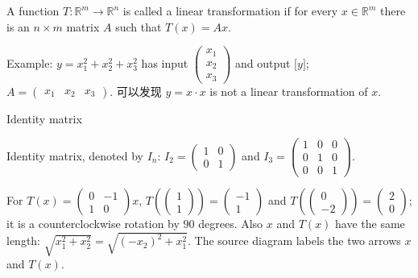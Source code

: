 \begin{definition}{}

A function \(T:\mathbb{R}^{m}\rightarrow\mathbb{R}^{n}\) is called a linear transformation if for every \(x \in \mathbb{R}^{m}\) there is an \(n \times m\) matrix \(A\) such that \(T(x) = Ax\).

Example: \(y = x_{1}^{2} + x_{2}^{2} + x_{3}^{2}\) has input \(\begin{pmatrix}
x_{1} \\
x_{2} \\
x_{3}
\end{pmatrix}\) and output \(\lbrack y\rbrack\); \(A = \begin{pmatrix}
x_{1} & x_{2} & x_{3}
\end{pmatrix}\). 可以发现 \(y = x \cdot x\) is not a linear transformation of \(x\).

\end{definition}

\begin{definition}{Identity matrix}

Identity matrix, denoted by \(I_{n}\): \(I_{2} = \begin{pmatrix}
1 & 0 \\
0 & 1
\end{pmatrix}\) and \(I_{3} = \begin{pmatrix}
1 & 0 & 0 \\
0 & 1 & 0 \\
0 & 0 & 1
\end{pmatrix}\).

For \(T(x) = \begin{pmatrix}
0 & {- 1} \\
1 & 0
\end{pmatrix}x\), \(T\left( \begin{pmatrix}
1 \\
1
\end{pmatrix} \right) = \begin{pmatrix}
{- 1} \\
1
\end{pmatrix}\) and \(T\left( \begin{pmatrix}
0 \\
{- 2}
\end{pmatrix} \right) = \begin{pmatrix}
2 \\
0
\end{pmatrix}\); it is a counterclockwise rotation by \(90\) degrees. Also \(x\) and \(T(x)\) have the same length: \(\sqrt{x_{1}^{2} + x_{2}^{2}} = \sqrt{\left( {- x_{2}} \right)^{2} + x_{1}^{2}}\). The source diagram labels the two arrows \(x\) and \(T(x)\).

\end{definition}

